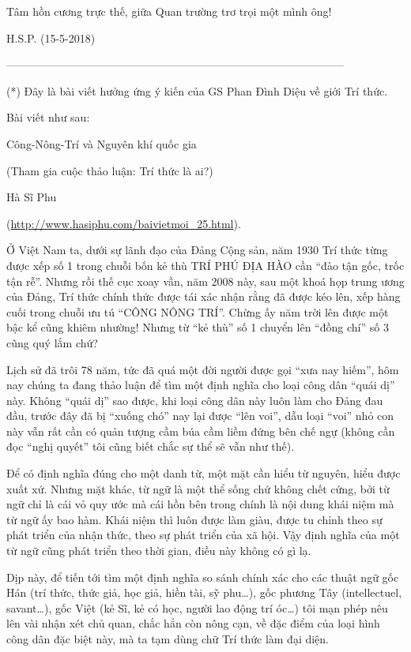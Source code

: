 Tâm hồn cương trực thế, giữa Quan trường trơ trọi một mình ông!

H.S.P. (15-5-2018)

——————————————————————————————–

(*) Đây là bài viết hưởng ứng ý kiến của GS Phan Đình Diệu về giới Trí thức.

Bài viết như sau:


Công-Nông-Trí và Nguyên khí quốc gia

(Tham gia cuộc thảo luận: Trí thức là ai?)

Hà Sĩ Phu

(\url{http://www.hasiphu.com/baivietmoi_25.html}).

Ở Việt Nam ta, dưới sự lãnh đạo của Đảng Cộng sản, năm 1930 Trí thức từng được xếp số 1 trong chuỗi bốn kẻ thù TRÍ PHÚ ĐỊA HÀO cần “đào tận gốc, trốc tận rễ”. Nhưng rồi thế cục xoay vần, năm 2008 này, sau một khoá họp trung ương của Đảng, Trí thức chính thức được tái xác nhận rằng đã được kéo lên, xếp hàng cuối trong chuỗi ưu tú “CÔNG NÔNG TRÍ”. Chừng ấy năm trời lên được một bậc kể cũng khiêm nhường! Nhưng từ “kẻ thù” số 1 chuyển lên “đồng chí” số 3 cũng quý lắm chứ?

Lịch sử đã trôi 78 năm, tức đã quá một đời người được gọi “xưa nay hiếm”, hôm nay chúng ta đang thảo luận để tìm một định nghĩa cho loại công dân “quái dị” này. Không “quái dị” sao được, khi loại công dân này luôn làm cho Đảng đau đầu, trước đây đã bị “xuống chó” nay lại được “lên voi”, dẫu loại “voi” nhỏ con này vẫn rất cần có quản tượng cầm búa cầm liềm đứng bên chế ngự (không cần đọc “nghị quyết” tôi cũng biết chắc sự thể sẽ vẫn như thế).

Để có định nghĩa đúng cho một danh từ, một mặt cần hiểu từ nguyên, hiểu được xuất xứ. Nhưng mặt khác, từ ngữ là một thể sống chứ không chết cứng, bởi từ ngữ chỉ là cái vỏ quy ước mà cái hồn bên trong chính là nội dung khái niệm mà từ ngữ ấy bao hàm. Khái niệm thì luôn được làm giàu, được tu chỉnh theo sự phát triển của nhận thức, theo sự phát triển của xã hội. Vậy định nghĩa của một từ ngữ cũng phát triển theo thời gian, điều này không có gì lạ.

Dịp này, để tiến tới tìm một định nghĩa so sánh chính xác cho các thuật ngữ gốc Hán (trí thức, thức giả, học giả, hiền tài, sỹ phu…), gốc phương Tây (intellectuel, savant…), gốc Việt (kẻ Sĩ, kẻ có học, người lao động trí óc…) tôi mạn phép nêu lên vài nhận xét chủ quan, chắc hẳn còn nông cạn, về đặc điểm của loại hình công dân đặc biệt này, mà ta tạm dùng chữ Trí thức làm đại diện.

